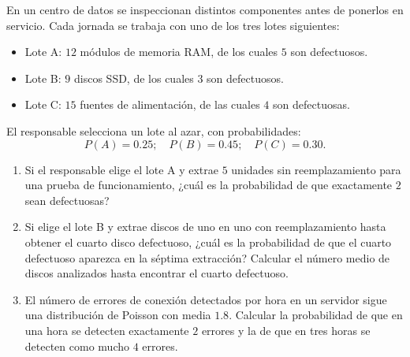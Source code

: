 \documentclass[12pt]{article}
\begin{document}
    \begin{ejercicio}[1.5 puntos]
        En un centro de datos se inspeccionan distintos componentes antes de ponerlos en servicio. Cada jornada se trabaja con uno de los tres lotes siguientes:
        \begin{itemize}
            \item Lote A: $12$ módulos de memoria RAM, de los cuales $5$ son defectuosos.
            \item Lote B: $9$ discos SSD, de los cuales $3$ son defectuosos.
            \item Lote C: $15$ fuentes de alimentación, de las cuales $4$ son defectuosas.
        \end{itemize}
        El responsable selecciona un lote al azar, con probabilidades:
        $$P(A)=0.25; \quad P(B)=0.45; \quad P(C)=0.30.$$
        \begin{enumerate}[label=\alph*)]
            \item Si el responsable elige el lote A y extrae $5$ unidades sin reemplazamiento para una prueba de funcionamiento, ¿cuál es la probabilidad de que exactamente $2$ sean defectuosas?
            \item Si elige el lote B y extrae discos de uno en uno con reemplazamiento hasta obtener el cuarto disco defectuoso, ¿cuál es la probabilidad de que el cuarto defectuoso aparezca en la séptima extracción? Calcular el número medio de discos analizados hasta encontrar el cuarto defectuoso.
            \item El número de errores de conexión detectados por hora en un servidor sigue una distribución de Poisson con media $1.8$. Calcular la probabilidad de que en una hora se detecten exactamente $2$ errores y la de que en tres horas se detecten como mucho $4$ errores.
        \end{enumerate}
    \end{ejercicio}
\end{document}
